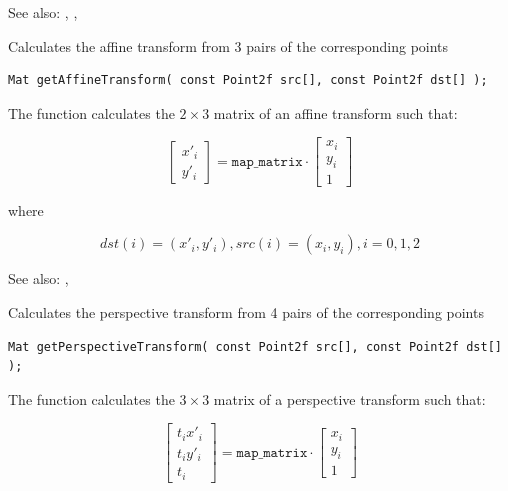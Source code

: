 See also: , , 

\label{getAffineTransform}
Calculates the affine transform from 3 pairs of the corresponding points

\begin{lstlisting}
Mat getAffineTransform( const Point2f src[], const Point2f dst[] );
\end{lstlisting}

\begin{description}
\end{description}

The function calculates the $2 \times 3$ matrix of an affine transform such that:

\[
\begin{bmatrix}
x'_i\\
y'_i
\end{bmatrix}
=
\texttt{map\_matrix}
\cdot
\begin{bmatrix}
x_i\\
y_i\\
1
\end{bmatrix}
\]

where

\[
dst(i)=(x'_i,y'_i),
src(i)=(x_i, y_i),
i=0,1,2
\]

See also: , 

\label{getPerspectiveTransform}
Calculates the perspective transform from 4 pairs of the corresponding points

\begin{lstlisting}
Mat getPerspectiveTransform( const Point2f src[], const Point2f dst[] );
\end{lstlisting}

\begin{description}
\end{description}

The function calculates the $3 \times 3$ matrix of a perspective transform such that:

\[
\begin{bmatrix}
t_i x'_i\\
t_i y'_i\\
t_i
\end{bmatrix}
=
\texttt{map\_matrix}
\cdot
\begin{bmatrix}
x_i\\
y_i\\
1
\end{bmatrix}
\]


